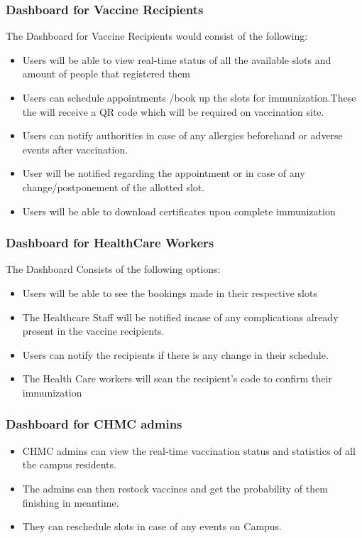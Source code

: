 \documentclass[10pt,twocolumn,letterpaper]{article}
\begin{document}
\subsubsection{Dashboard for Vaccine Recipients}
The Dashboard for Vaccine Recipients would consist of the following:
\begin{itemize}
    \item Users will be able to view real-time status of all the available slots and amount of people that registered them
    \item Users can schedule appointments /book up the slots for immunization.These the will receive  a QR code which will be required on vaccination site.
    \item Users can notify authorities in case of any allergies beforehand or adverse events after vaccination.
    \item User will be notified regarding the appointment or in case of any change/postponement of the allotted slot.
    \item Users will be able to download certificates upon complete immunization
\end{itemize}
\subsubsection{Dashboard for HealthCare Workers}
The Dashboard Consists of the following options:
\begin{itemize}
\item Users will be able to see the bookings made in their respective slots
\item The Healthcare Staff will be notified incase of any complications already present in the vaccine recipients.
\item Users can notify the recipients if there is any change in their schedule.
\item The Health Care workers will scan the recipient's code to confirm their immunization
\end{itemize}
\subsubsection{Dashboard for CHMC admins}
\begin{itemize}
\item CHMC admins can view the real-time vaccination status and statistics of all the campus residents.
\item The admins can then restock vaccines and get the probability of them finishing in meantime.
\item They can reschedule slots in case of any events on Campus.
\end{itemize}
\end{document}
